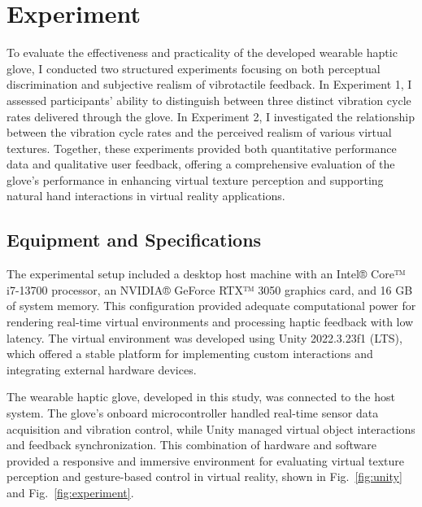\chapter{Experiment} %

\label{Chapter4} %






To evaluate the effectiveness and practicality of the developed wearable haptic glove, I conducted two structured experiments focusing on both perceptual discrimination and subjective realism of vibrotactile feedback. 
In Experiment 1, I assessed participants' ability to distinguish between three distinct vibration cycle rates delivered through the glove. 
In Experiment 2, I investigated the relationship between the vibration cycle rates and the perceived realism of various virtual textures. 
Together, these experiments provided both quantitative performance data and qualitative user feedback, offering a comprehensive evaluation of the glove’s performance in enhancing virtual texture perception and supporting natural hand interactions in virtual reality applications.

\section{Equipment and Specifications}
The experimental setup included a desktop host machine with an Intel® Core™ i7-13700 processor, an NVIDIA® GeForce RTX™ 3050 graphics card, and 16 GB of system memory. This configuration provided adequate computational power for rendering real-time virtual environments and processing haptic feedback with low latency. The virtual environment was developed using Unity 2022.3.23f1 (LTS), which offered a stable platform for implementing custom interactions and integrating external hardware devices.

The wearable haptic glove, developed in this study, was connected to the host system. The glove’s onboard microcontroller handled real-time sensor data acquisition and vibration control, while Unity managed virtual object interactions and feedback synchronization. This combination of hardware and software provided a responsive and immersive environment for evaluating virtual texture perception and gesture-based control in virtual reality, shown in Fig.~\ref{fig:unity} and Fig.~\ref{fig:experiment}.


